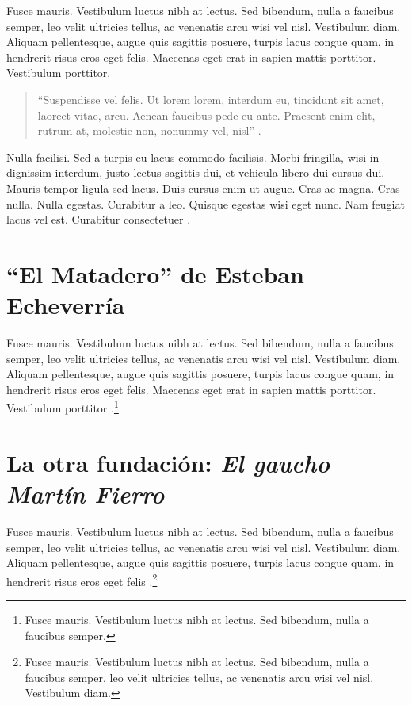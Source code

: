 Fusce mauris. Vestibulum luctus nibh at lectus. Sed bibendum, nulla a faucibus semper, leo velit ultricies tellus, ac venenatis arcu wisi vel nisl. Vestibulum diam. Aliquam pellentesque, augue quis sagittis posuere, turpis lacus congue quam, in hendrerit risus eros eget felis. Maecenas eget erat in sapien mattis porttitor. Vestibulum porttitor.

\begin{quote}
	\enquote{Suspendisse vel felis. Ut lorem lorem, interdum eu, tincidunt sit amet, laoreet vitae, arcu. Aenean faucibus pede eu ante. Praesent enim elit, rutrum at, molestie non, nonummy vel, nisl} \parencite{@3188-SHELLY2023}.
\end{quote}

Nulla facilisi. Sed a turpis eu lacus commodo facilisis. Morbi fringilla, wisi in dignissim interdum, justo lectus sagittis dui, et vehicula libero dui cursus dui. Mauris tempor ligula sed lacus. Duis cursus enim ut augue. Cras ac magna. Cras nulla. Nulla egestas. Curabitur a leo. Quisque egestas wisi eget nunc. Nam feugiat lacus vel est. Curabitur consectetuer \parencite{@3190-QUIROGA2016}.

\section{\enquote{El Matadero} de Esteban Echeverría}

Fusce mauris. Vestibulum luctus nibh at lectus. Sed bibendum, nulla a faucibus semper, leo velit ultricies tellus, ac venenatis arcu wisi vel nisl. Vestibulum diam. Aliquam pellentesque, augue quis sagittis posuere, turpis lacus congue quam, in hendrerit risus eros eget felis. Maecenas eget erat in sapien mattis porttitor. Vestibulum porttitor \parencite{@3190-QUIROGA2016}.\footnote{Fusce mauris. Vestibulum luctus nibh at lectus. Sed bibendum, nulla a faucibus semper.}

\section{La otra fundación: \emph{El gaucho Martín Fierro}}

Fusce mauris. Vestibulum luctus nibh at lectus. Sed bibendum, nulla a faucibus semper, leo velit ultricies tellus, ac venenatis arcu wisi vel nisl. Vestibulum diam. Aliquam pellentesque, augue quis sagittis posuere, turpis lacus congue quam, in hendrerit risus eros eget felis \parencite{@3188-SHELLY2023}.\footnote{Fusce mauris. Vestibulum luctus nibh at lectus. Sed bibendum, nulla a faucibus semper, leo velit ultricies tellus, ac venenatis arcu wisi vel nisl. Vestibulum diam.}

